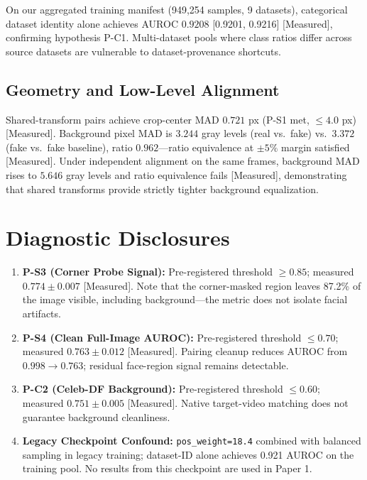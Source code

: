 \documentclass[10pt,twocolumn]{article}
\begin{document}
On our aggregated training manifest (949,254 samples, 9 datasets), categorical dataset identity alone achieves AUROC $0.9208$ [0.9201, 0.9216] [Measured], confirming hypothesis P-C1.
Multi-dataset pools where class ratios differ across source datasets are vulnerable to dataset-provenance shortcuts.

\subsection{Geometry and Low-Level Alignment}

Shared-transform pairs achieve crop-center MAD $0.721$ px (P-S1 met, $\leq 4.0$ px) [Measured].
Background pixel MAD is $3.244$ gray levels (real vs.\ fake) vs.\ $3.372$ (fake vs.\ fake baseline), ratio $0.962$---ratio equivalence at $\pm 5\%$ margin satisfied [Measured].
Under independent alignment on the same frames, background MAD rises to $5.646$ gray levels and ratio equivalence fails [Measured], demonstrating that shared transforms provide strictly tighter background equalization.

\section{Diagnostic Disclosures}

\begin{enumerate}[leftmargin=*,label=\arabic*.]
\item \textbf{P-S3 (Corner Probe Signal):} Pre-registered threshold $\geq 0.85$; measured $0.774 \pm 0.007$ [Measured]. Note that the corner-masked region leaves 87.2\% of the image visible, including background---the metric does not isolate facial artifacts.
\item \textbf{P-S4 (Clean Full-Image AUROC):} Pre-registered threshold $\leq 0.70$; measured $0.763 \pm 0.012$ [Measured]. Pairing cleanup reduces AUROC from $0.998 \to 0.763$; residual face-region signal remains detectable.
\item \textbf{P-C2 (Celeb-DF Background):} Pre-registered threshold $\leq 0.60$; measured $0.751 \pm 0.005$ [Measured]. Native target-video matching does not guarantee background cleanliness.
\item \textbf{Legacy Checkpoint Confound:} \texttt{pos\_weight=18.4} combined with balanced sampling in legacy training; dataset-ID alone achieves 0.921 AUROC on the training pool. No results from this checkpoint are used in Paper 1.
\end{enumerate}
\end{document}
